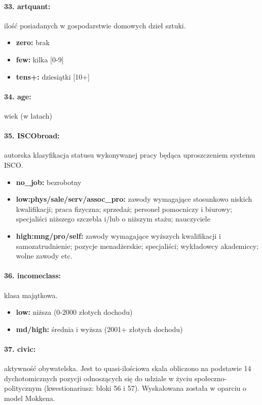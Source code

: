 \documentclass[10pt, a4paper]{article}
\begin{document}
\paragraph{33. artquant:} ilość posiadanych w gospodarstwie domowych dzieł sztuki.
\begin{itemize}
	\item {\bf zero:} brak
	\item {\bf few:} kilka [0-9]
	\item {\bf tens+:} dziesiątki [10+]
\end{itemize}
\paragraph{34. age:} wiek (w latach)
\paragraph{35. ISCObroad:} autorska klasyfikacja statusu wykonywanej pracy będąca uproszczeniem systemu ISCO.
\begin{itemize}
	\item {\bf no\_job:} bezrobotny
	\item {\bf low:phys/sale/serv/assoc\_pro:} zawody wymagające stosunkowo niskich kwalifikacji; praca fizyczna; sprzedaż; personel pomocniczy i biurowy; specjaliści niższego szczebla i/lub o niższym stażu; nauczyciele
	\item {\bf high:mng/pro/self:} zawody wymagające wyższych kwalifikacji i samozatrudnienie; pozycje menadżerskie; specjaliści; wykładowcy akademiccy; wolne zawody etc.
\end{itemize}
\paragraph{36. incomeclass:} klasa majątkowa.
\begin{itemize}
	\item {\bf low:} niższa (0-2000 złotych dochodu)
	\item {\bf md/high:} średnia i wyższa (2001+ złotych dochodu)
\end{itemize}
\paragraph{37. civic:} aktywność obywatelska. Jest to quasi-ilościowa skala obliczono na podstawie 14 dychotomicznych pozycji odnoszących się do udziale w życiu społeczno-politycznym (kwestionariusz: bloki 56 i 57). Wyskalowana została w oparciu o model Mokkena.
\end{document}
